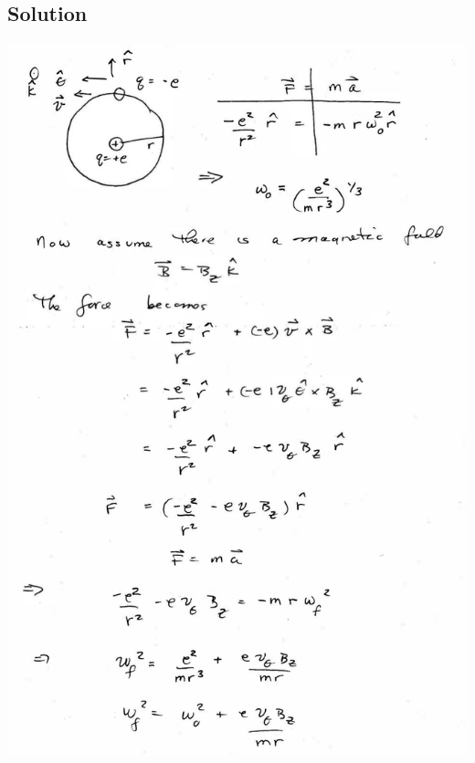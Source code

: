 \documentclass[solutions]{esg8022pset}
\begin{document}
\subsection{Solution}
  \begin{center}\includegraphics[width=\textwidth]{ps07_sol_02_1.pdf}\end{center}
\end{document}
